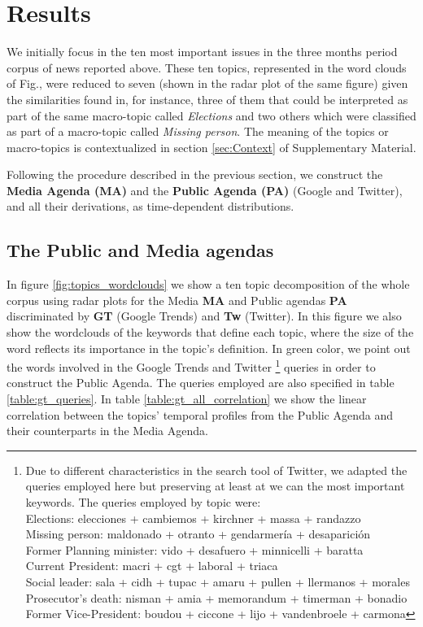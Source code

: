 \documentclass{bmcart}
\begin{document}
\section*{Results}
\label{results}

\par We initially focus in the ten most important issues in the three months period corpus of news reported above. These ten topics, represented in the word clouds  of Fig.\label{fig:topics_wordclouds}, were reduced to seven (shown in the radar plot of the same figure) given the similarities found in, for instance, three of them that could be interpreted as part of the same macro-topic called \emph{Elections} and two others which were classified as part of a macro-topic called \emph{Missing person}. The meaning of the topics or macro-topics is contextualized in section \ref{sec:Context} of Supplementary Material. 
\par Following the procedure described in the previous section, we construct the \textbf{Media Agenda (MA)} and the \textbf{Public Agenda (PA)} (Google and Twitter), and all their derivations, as time-dependent distributions. 

\subsection*{The Public and Media agendas}

\par In figure \ref{fig:topics_wordclouds} we show a ten topic decomposition of the whole corpus using radar plots for the Media \textbf{MA} and Public agendas \textbf{PA} discriminated by \textbf{GT} (Google Trends) and \textbf{Tw} (Twitter). In this figure we also show the wordclouds of the keywords that define each topic, where the size of the word reflects its importance in the topic's definition. In green color, we point out the words involved in the Google Trends and Twitter  \footnote{Due to different characteristics in the search tool of Twitter, we adapted the queries employed here but preserving at least at we can the most important keywords. The queries employed by topic were: \\
Elections: elecciones + cambiemos + kirchner + massa + randazzo \\
Missing person: maldonado + otranto + gendarmer\'ia + desaparici\'on \\
Former Planning minister: vido + desafuero + minnicelli + baratta \\
Current President: macri + cgt + laboral +  triaca \\
Social leader:  sala + cidh + tupac + amaru + pullen + llermanos + morales \\
Prosecutor’s death: nisman + amia + memorandum + timerman +  bonadio \\
Former Vice-President:  boudou + ciccone +  lijo + vandenbroele + carmona
} queries in order to construct the Public Agenda. The queries employed are also specified in table \ref{table:gt_queries}. In table \ref{table:gt_all_correlation} we show the linear correlation between the topics' temporal profiles from the Public Agenda and their counterparts in the Media Agenda.
\end{document}

